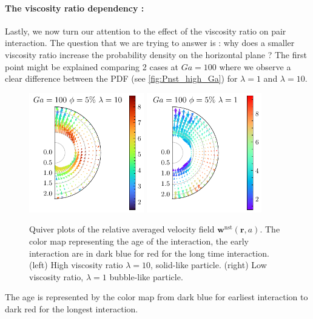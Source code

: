\paragraph*{The viscosity ratio dependency :}
Lastly, we now turn our attention to the effect of the viscosity ratio on pair interaction.
The question that we are trying to answer is : why does a smaller viscosity ratio increase the probability density on the horizontal plane ? 
The first point might be explained comparing 2 cases at $Ga = 100$ where we observe a clear difference between the PDF (see \ref{fig:Pnst_high_Ga}) for $\lambda = 1$ and  $\lambda = 10$.
\begin{figure}[h!]
    \centering
    \includegraphics[width=5cm]{image/HOMOGENEOUS_NEW/Dist/U_rel_l_10_Ga_100_PHI_5.pdf}
    \includegraphics[width=5cm]{image/HOMOGENEOUS_NEW/Dist/U_rel_l_1_Ga_100_PHI_5.pdf}
    \caption{Quiver plots of the relative averaged velocity field $\textbf{w}^\text{nst}(\textbf{r},a)$.
    The color map representing the age of the interaction, the early interaction are in dark blue for red for the long time interaction.
    (left) High viscosity ratio $\lambda = 10$, solid-like particle.
    (right) Low viscosity ratio, $\lambda = 1$ bubble-like particle. }
    \label{fig:Why_l_matter}
\end{figure}
The age is represented by the color map from dark blue for earliest interaction to dark red for the longest interaction. 
